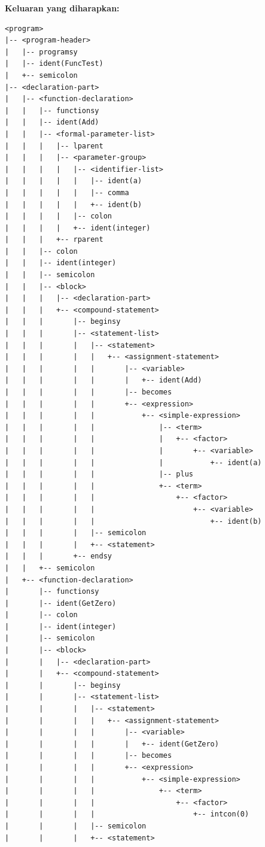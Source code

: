 \documentclass[12pt,a4paper]{article}
\begin{document}
\textbf{Keluaran yang diharapkan:}
\begin{lstlisting}[style=default]
<program>
|-- <program-header>
|   |-- programsy
|   |-- ident(FuncTest)
|   +-- semicolon
|-- <declaration-part>
|   |-- <function-declaration>
|   |   |-- functionsy
|   |   |-- ident(Add)
|   |   |-- <formal-parameter-list>
|   |   |   |-- lparent
|   |   |   |-- <parameter-group>
|   |   |   |   |-- <identifier-list>
|   |   |   |   |   |-- ident(a)
|   |   |   |   |   |-- comma
|   |   |   |   |   +-- ident(b)
|   |   |   |   |-- colon
|   |   |   |   +-- ident(integer)
|   |   |   +-- rparent
|   |   |-- colon
|   |   |-- ident(integer)
|   |   |-- semicolon
|   |   |-- <block>
|   |   |   |-- <declaration-part>
|   |   |   +-- <compound-statement>
|   |   |       |-- beginsy
|   |   |       |-- <statement-list>
|   |   |       |   |-- <statement>
|   |   |       |   |   +-- <assignment-statement>
|   |   |       |   |       |-- <variable>
|   |   |       |   |       |   +-- ident(Add)
|   |   |       |   |       |-- becomes
|   |   |       |   |       +-- <expression>
|   |   |       |   |           +-- <simple-expression>
|   |   |       |   |               |-- <term>
|   |   |       |   |               |   +-- <factor>
|   |   |       |   |               |       +-- <variable>
|   |   |       |   |               |           +-- ident(a)
|   |   |       |   |               |-- plus
|   |   |       |   |               +-- <term>
|   |   |       |   |                   +-- <factor>
|   |   |       |   |                       +-- <variable>
|   |   |       |   |                           +-- ident(b)
|   |   |       |   |-- semicolon
|   |   |       |   +-- <statement>
|   |   |       +-- endsy
|   |   +-- semicolon
|   +-- <function-declaration>
|       |-- functionsy
|       |-- ident(GetZero)
|       |-- colon
|       |-- ident(integer)
|       |-- semicolon
|       |-- <block>
|       |   |-- <declaration-part>
|       |   +-- <compound-statement>
|       |       |-- beginsy
|       |       |-- <statement-list>
|       |       |   |-- <statement>
|       |       |   |   +-- <assignment-statement>
|       |       |   |       |-- <variable>
|       |       |   |       |   +-- ident(GetZero)
|       |       |   |       |-- becomes
|       |       |   |       +-- <expression>
|       |       |   |           +-- <simple-expression>
|       |       |   |               +-- <term>
|       |       |   |                   +-- <factor>
|       |       |   |                       +-- intcon(0)
|       |       |   |-- semicolon
|       |       |   +-- <statement>

\end{lstlisting}
\end{document}
